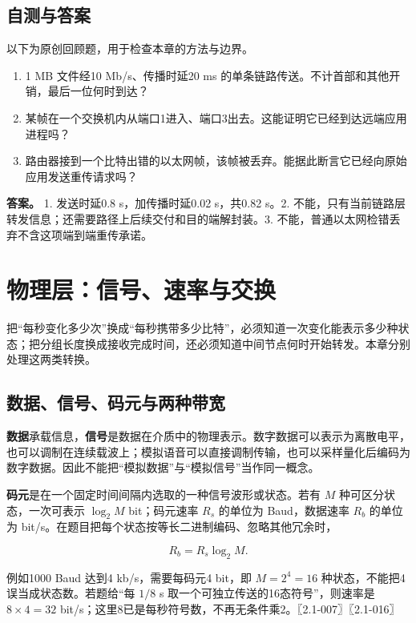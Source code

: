 \section{自测与答案}\label{cn-ch1-review}

以下为原创回顾题，用于检查本章的方法与边界。

\begin{enumerate}
\def\labelenumi{\arabic{enumi}.}
\tightlist
\item
  1 MB 文件经10 Mb/s、传播时延20 ms 的单条链路传送。不计首部和其他开销，最后一位何时到达？
\item
  某帧在一个交换机内从端口1进入、端口3出去。这能证明它已经到达远端应用进程吗？
\item
  路由器接到一个比特出错的以太网帧，该帧被丢弃。能据此断言它已经向原始应用发送重传请求吗？
\end{enumerate}

\textbf{答案。} 1. 发送时延0.8 s，加传播时延0.02 s，共0.82 s。2. 不能，只有当前链路层转发信息；还需要路径上后续交付和目的端解封装。3. 不能，普通以太网检错丢弃不含这项端到端重传承诺。

\chapter{物理层：信号、速率与交换}\label{cn-ch2}

把``每秒变化多少次''换成``每秒携带多少比特''，必须知道一次变化能表示多少种状态；把分组长度换成接收完成时间，还必须知道中间节点何时开始转发。本章分别处理这两类转换。

\section{数据、信号、码元与两种带宽}\label{cn-02-01}

\textbf{数据}承载信息，\textbf{信号}是数据在介质中的物理表示。数字数据可以表示为离散电平，也可以调制在连续载波上；模拟语音可以直接调制传输，也可以采样量化后编码为数字数据。因此不能把``模拟数据''与``模拟信号''当作同一概念。

\textbf{码元}是在一个固定时间间隔内选取的一种信号波形或状态。若有 \(M\) 种可区分状态，一次可表示 \(\log_2M\) bit；码元速率 \(R_s\) 的单位为 Baud，数据速率 \(R_b\) 的单位为 bit/s。在题目把每个状态按等长二进制编码、忽略其他冗余时，

\[R_b=R_s\log_2M.\]

例如1000 Baud 达到4 kb/s，需要每码元4 bit，即 \(M=2^4=16\) 种状态，不能把4误当成状态数。若题给``每 \(1/8\) s 取一个可独立传送的16态符号''，则速率是 \(8\times4=32\) bit/s；这里8已是每秒符号数，不再无条件乘2。〖2.1-007〗〖2.1-016〗

